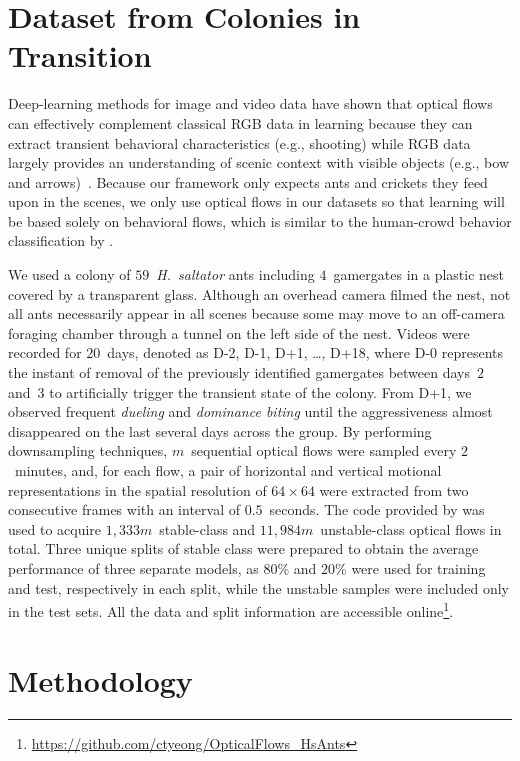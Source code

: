 \documentclass[letterpaper]{article} %
\begin{document}
\section{Dataset from Colonies in Transition}
\label{sec:dataset}

Deep-learning methods for image and video data have shown that optical
flows can effectively complement classical RGB data in learning because
they can extract transient behavioral characteristics (e.g., shooting)
while RGB data largely provides an understanding of scenic context with
visible objects (e.g., bow and arrows)~\citep{SZ14}. Because our
framework only expects ants and crickets they feed upon in
the scenes, we only use optical flows in our datasets so that learning
will be based solely on behavioral flows, which is similar to
the human-crowd behavior classification by \citet{MOS09}.

We used a colony of $59$~\emph{H.~saltator} ants including $4$~gamergates
in a plastic nest covered by a transparent glass. Although an overhead camera
filmed the nest, not all ants necessarily appear in all scenes because some may
move to an off-camera foraging chamber through a tunnel on the left side
of the nest.
Videos were recorded for $20$~days, denoted as D-2, D-1, D+1,
\dots, D+18, where D-0 represents the instant of removal of the previously
identified gamergates between days~$2$ and~$3$ to artificially trigger
the transient state of the colony. From D+1, we observed frequent
\emph{dueling} and \emph{dominance biting} until the aggressiveness
almost disappeared on the last several days across the group. By
performing downsampling techniques, $m$~sequential optical flows were
sampled every $2$~minutes, and, for each flow, a pair of horizontal and
vertical motional representations in the spatial resolution of $64
\times 64$ were extracted from two consecutive frames with an interval
of $0.5$~seconds. The code provided by \citet{WXWQLTV16} was used to
acquire $1,333m$~stable-class and $11,984m$~unstable-class optical flows
in total. Three unique splits of stable class were prepared to obtain
the average performance of three separate models, as $80\%$ and $20\%$
were used for training and test, respectively in each split, while the
unstable samples were included only in the test sets. All the data and
split information are accessible
online\footnote{\url{https://github.com/ctyeong/OpticalFlows_HsAnts}}.

\section{Methodology}
\label{sec:method}
\end{document}
